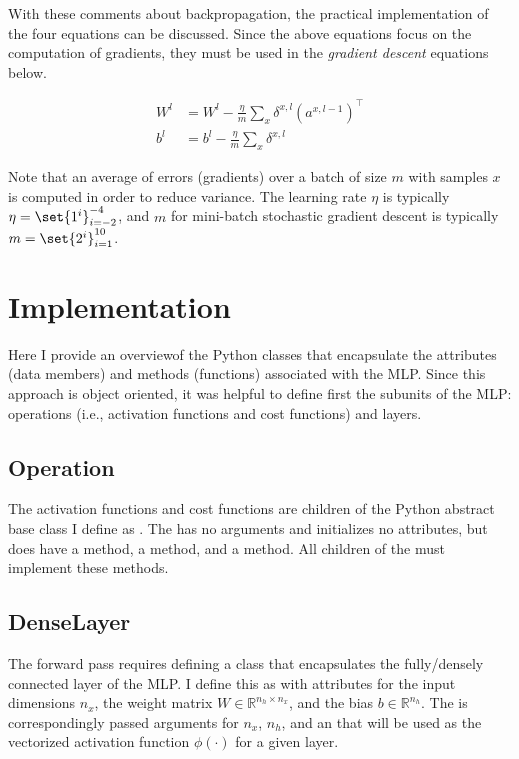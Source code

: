 \documentclass{article}
\DeclarePairedDelimiter\set\{\}
\begin{document}
With these comments about backpropagation,
the practical implementation of the four equations can be discussed.
Since the above equations focus on the computation of gradients,
they must be used in the \textit{gradient descent} equations below.

\begin{align}
	W^{l} & = W^{l} - \frac{\eta}{m} \sum_{x}{\delta^{x, l}(a^{x, l-1})^\top} \\
	b^{l} & = b^{l} - \frac{\eta}{m} \sum_{x}{\delta^{x, l}}
\end{align}

Note that an average of errors (gradients) over a batch of size $m$
with samples $x$
is computed in order to reduce variance. The learning rate $\eta$ is typically
$\eta = \set{1^{i}}_{i=-2}^{-4}$, and $m$
for mini-batch stochastic gradient descent is typically
$m = \set{2^{i}}_{i=1}^{10}$.

\section{Implementation}

Here I provide an overviewof  the Python classes
that encapsulate the attributes (data members) and methods (functions) associated
with the MLP. Since this approach is object oriented, it was helpful to
define first the subunits of the MLP: operations (i.e., activation functions and
cost functions) and layers.

\subsection{Operation}

The activation functions and cost functions are children of the Python
abstract base class I define as . The
 has no arguments and initializes no attributes, but
does have a  method, a  method, and
a  method. All
children of the  must implement these methods.

\subsection{DenseLayer}

The forward pass requires defining a class that
encapsulates the fully/densely connected layer of the MLP. I define this as
 with attributes for the input dimensions $n_x$,
the weight matrix $W \in \mathbb{R}^{n_h \times n_x}$, and the bias
${b \in \mathbb{R}^{n_h}}$. The  is correspondingly passed
arguments for $n_x$, $n_h$, and an 
that will be used as the vectorized activation function $\phi(\cdot)$ for a given layer.
\end{document}
